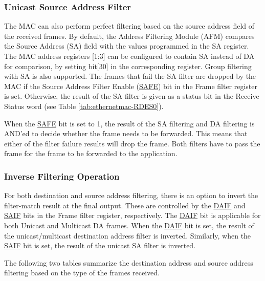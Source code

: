 \documentclass[main\_\_EN.tex]{subfiles}
\begin{document}
\subsubsection{Unicast Source Address Filter}
The MAC can also perform perfect filtering based on the source address field of the received frames. By default, the Address Filtering Module (AFM) compares the Source Address (SA) field with the values programmed in the SA register. The MAC address registers [1:3] can be configured to contain SA instead of DA for comparison, by setting bit[30] in the corresponding register. Group filtering with SA is also supported. The frames that fail the SA filter are dropped by the MAC if the Source Address Filter Enable (\hyperref[regdesc:EMACFFREG]{SAFE}) bit in the Frame filter register is set. Otherwise, the result of the SA filter is given as a status bit in the Receive Status word (see Table \ref{tab:ethernetmac-RDES0}).

When the \hyperref[regdesc:EMACFFREG]{SAFE} bit is set to 1, the result of the SA filtering and DA filtering is AND'ed to decide whether the
frame needs to be forwarded. This means that either of the filter failure results will drop the
frame. Both filters have to pass the frame for the frame to be forwarded to the application.

\subsubsection{Inverse Filtering Operation}
For both destination and source address filtering, there is an option to invert the filter-match
result at the final output. These are controlled by the \hyperref[regdesc:EMACFFREG]{DAIF} and \hyperref[regdesc:EMACFFREG]{SAIF} bits in the Frame filter register, respectively. The \hyperref[regdesc:EMACFFREG]{DAIF} bit is applicable for both Unicast and Multicast DA frames.
When the \hyperref[regdesc:EMACFFREG]{DAIF} bit is set, the result of the unicast/multicast destination address filter is inverted.
Similarly, when the \hyperref[regdesc:EMACFFREG]{SAIF} bit is set, the result of the unicast SA filter is inverted.

The following two tables summarize the destination address and source address filtering based on the type of the frames received.
\end{document}
